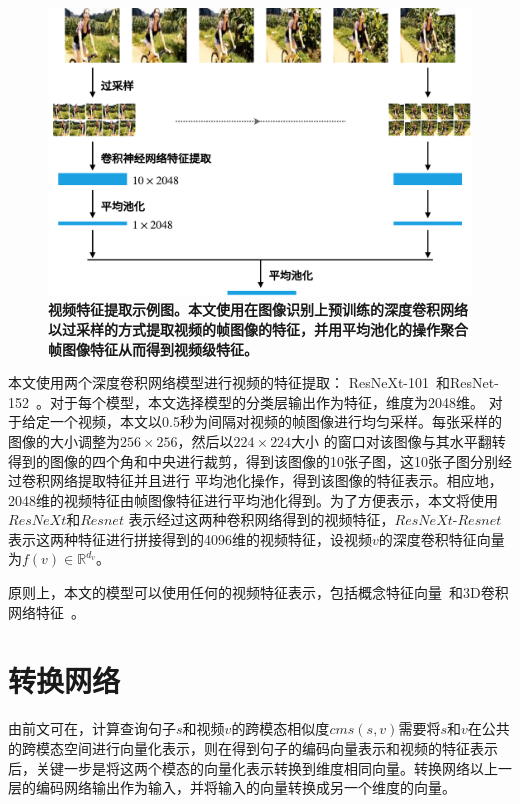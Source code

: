\begin{figure}[tbh!]
    \centering
    \includegraphics[width=\linewidth]{figures/video-cnn-feat}
    \caption[视频特征提取示例图]{\textbf{视频特征提取示例图。本文使用在图像识别上预训练的深度卷积网络以过采样的方式提取视频的帧图像的特征，并用平均池化的操作聚合帧图像特征从而得到视频级特征。}}
    \label{fig:video-cnn-feat}
\end{figure}

本文使用两个深度卷积网络模型进行视频的特征提取：
ResNeXt-101~\cite{xie2017aggregated}和ResNet-152~\cite{he2016deep}。对于每个模型，本文选择模型的分类层输出作为特征，维度为2048维。
对于给定一个视频，本文以0.5秒为间隔对视频的帧图像进行均匀采样。每张采样的图像的大小调整为$256\times256$，然后以$224\times224$大小
的窗口对该图像与其水平翻转得到的图像的四个角和中央进行裁剪，得到该图像的10张子图，这10张子图分别经过卷积网络提取特征并且进行
平均池化操作，得到该图像的特征表示。相应地，2048维的视频特征由帧图像特征进行平均池化得到。为了方便表示，本文将使用$ResNeXt$和$Resnet$
表示经过这两种卷积网络得到的视频特征，$ResNeXt$-$Resnet$表示这两种特征进行拼接得到的4096维的视频特征，设视频$v$的深度卷积特征向量为$f(v) \in \mathbb{R}^{d_v}$。

原则上，本文的模型可以使用任何的视频特征表示，包括概念特征向量~\cite{markatopoulou2017query,lu2016event,merler2012semantic}和3D卷积网络特征~\cite{mithun2018learning}。

\section{转换网络}
由前文可在，计算查询句子$s$和视频$v$的跨模态相似度$cms(s,v)$需要将$s$和$v$在公共的跨模态空间进行向量化表示，则在得到句子的编码向量表示和视频的特征表示后，关键一步是将这两个模态的向量化表示转换到维度相同向量。转换网络以上一层的编码网络输出作为输入，并将输入的向量转换成另一个维度的向量。

